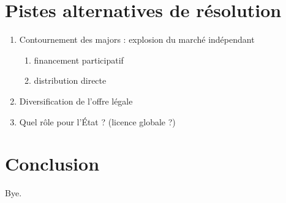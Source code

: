 \documentclass[a4paper]{report}
\begin{document}




	\chapter{Pistes alternatives de résolution}

	\begin{enumerate}
		\item Contournement des majors : explosion du marché indépendant
		\begin{enumerate}
		 	\item financement participatif
		 	\item distribution directe
		 \end{enumerate}
		 \item Diversification de l'offre légale
		 \item Quel rôle pour l'État ? (licence globale ?)
	\end{enumerate}





	\chapter{Conclusion}

	Bye.



	
	




\end{document}
